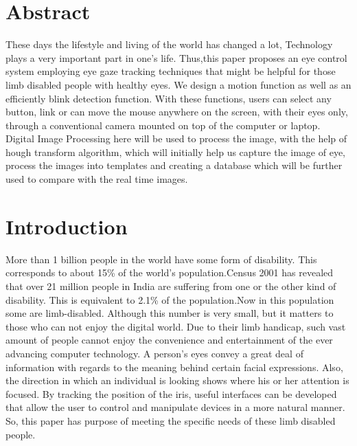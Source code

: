 \documentclass[12pt,singleside,a4paper]{article}
\begin{document}


\pagebreak
\section*{Abstract}
\hspace{1mm} These days the lifestyle and living of the world has changed a lot, Technology plays a very important part in one’s life. Thus,this paper proposes an eye control system employing eye gaze tracking techniques that might be helpful for those limb disabled people with healthy eyes. We design a motion function as well as an efficiently blink detection function. With these functions, users can select any button, link or can move the mouse anywhere on the screen, with their eyes only, through a conventional camera mounted on top of the computer or laptop. Digital Image Processing here will be used to process the image, with the help of hough transform algorithm, which will initially help us capture the image of eye, process the images into templates and creating a database which will be further used to compare with the real time images.

\section*{Introduction}
\hspace{1mm}More than 1 billion people in the world have some form of disability. This corresponds to about 15\% of the world's population.Census 2001 has revealed that over 21 million people in India are suffering from one or the other kind of disability. This is equivalent to 2.1\% of the population.Now in this population some are limb-disabled. Although this number is very small, but it matters to those who can not enjoy the digital world.\vspace{2mm}\newline
Due to their limb handicap, such vast amount of people cannot enjoy the convenience and entertainment of the ever advancing computer technology. A person's eyes convey a great deal of information with regards to the meaning behind certain facial expressions. Also, the direction in which an individual is looking shows where his or her attention is focused. By tracking the position of the iris, useful interfaces can be developed that allow the user to control and manipulate devices in a more natural manner. So, this paper has purpose of meeting the specific needs of these limb disabled people.
\end{document}
